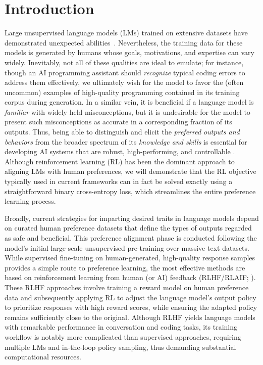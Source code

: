 \section{Introduction}
Large unsupervised language models (LMs) trained on extensive datasets have demonstrated unexpected abilities~\citep{chowdhery2022palm, brown2020language, touvron2023llama, bubeck2023sparks}. Nevertheless, the training data for these models is generated by humans whose goals, motivations, and expertise can vary widely. Inevitably, not all of these qualities are ideal to emulate; for instance, though an AI programming assistant should \textit{recognize} typical coding errors to address them effectively, we ultimately wish for the model to favor the (often uncommon) examples of high-quality programming contained in its training corpus during generation. In a similar vein, it is beneficial if a language model is \textit{familiar} with widely held misconceptions, but it is undesirable for the model to present such misconceptions as accurate in a corresponding fraction of its outputs. Thus, being able to distinguish and elicit the \emph{preferred outputs and behaviors} from the broader spectrum of its \textit{knowledge and skills} is essential for developing AI systems that are robust, high-performing, and controllable \citep{ouyang2022training}. Although reinforcement learning (RL) has been the dominant approach to aligning LMs with human preferences, we will demonstrate that the RL objective typically used in current frameworks can in fact be solved exactly using a straightforward binary cross-entropy loss, which streamlines the entire preference learning process.

Broadly, current strategies for imparting desired traits in language models depend on curated human preference datasets that define the types of outputs regarded as safe and beneficial. This preference alignment phase is conducted following the model’s initial large-scale unsupervised pre-training over massive text datasets. While supervised fine-tuning on human-generated, high-quality response samples provides a simple route to preference learning, the most effective methods are based on reinforcement learning from human (or AI) feedback (RLHF/RLAIF; \citep{christiano2017deep, bai2022constitutional}). These RLHF approaches involve training a reward model on human preference data and subsequently applying RL to adjust the language model’s output policy to prioritize responses with high reward scores, while ensuring the adapted policy remains sufficiently close to the original. Although RLHF yields language models with remarkable performance in conversation and coding tasks, its training workflow is notably more complicated than supervised approaches, requiring multiple LMs and in-the-loop policy sampling, thus demanding substantial computational resources.

